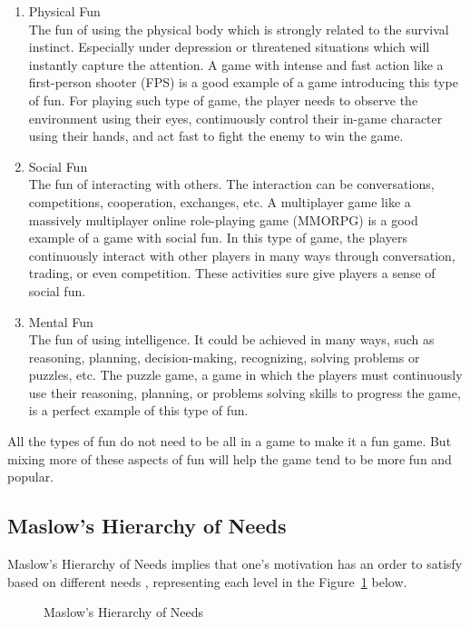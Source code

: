 \documentclass[12pt,oneside,openright,a4paper]{cpe-english-project}
\begin{document}
\begin{enumerate}
	\item Physical Fun \\
	The fun of using the physical body which is strongly related to the survival instinct. Especially under depression or threatened situations which will instantly capture the attention. A game with intense and fast action like a first-person shooter (FPS) is a good example of a game introducing this type of fun. For playing such type of game, the player needs to observe the environment using their eyes, continuously control their in-game character using their hands, and act fast to fight the enemy to win the game.
	\item Social Fun \\
	The fun of interacting with others. The interaction can be conversations, competitions, cooperation, exchanges, etc. A multiplayer game like a massively multiplayer online role-playing game (MMORPG) is a good example of a game with social fun. In this type of game, the players continuously interact with other players in many ways through conversation, trading, or even competition. These activities sure give players a sense of social fun.
	\item Mental Fun \\
	The fun of using intelligence. It could be achieved in many ways, such as reasoning, planning, decision-making, recognizing, solving problems or puzzles, etc. The puzzle game, a game in which the players must continuously use their reasoning, planning, or problems solving skills to progress the game, is a perfect example of this type of fun.
\end{enumerate}

All the types of fun do not need to be all in a game to make it a fun game. But mixing more of these aspects of fun will help the game tend to be more fun and popular.

\subsection{Maslow's Hierarchy of Needs}
Maslow's Hierarchy of Needs implies that one's motivation has an order to satisfy based on different needs \cite{saul2022simplypsychology}, representing each level in the Figure~\ref{fig:theory-maslow-needs} below.

\begin{figure}[!h]\centering
{}
\caption{Maslow's Hierarchy of Needs}
\label{fig:theory-maslow-needs}
\end{figure}
\end{document}
